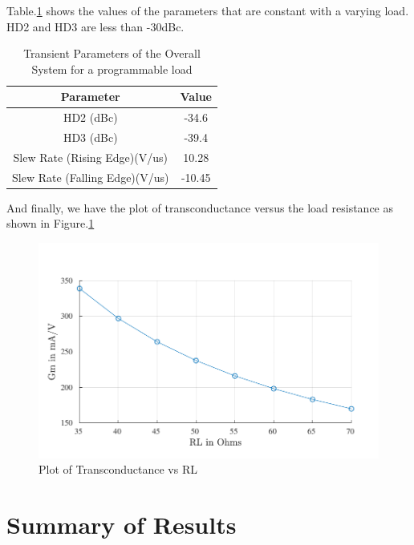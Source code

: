 Table.\ref{tab:RL_trans_2} shows the values of the parameters that are constant with a varying load. HD2 and HD3 are less than -30dBc.
\begin{table} [H]
\centering
\begin{tabular}{@{}cc@{}}
\toprule
Parameter							& Value		\\ \midrule
HD2 (dBc)							& -34.6 			\\
HD3 (dBc)							& -39.4 			\\
Slew Rate (Rising Edge)(V/us)		& 10.28 			\\
Slew Rate (Falling Edge)(V/us)		& -10.45 			\\
\bottomrule
\end{tabular}
\caption{Transient Parameters of the Overall System for a programmable load}
\label{tab:RL_trans_2}
\end{table}
And finally, we have the plot of transconductance versus the load resistance as shown in Figure.\ref{fig:RL_Gm}
\begin{figure} [H]
\centering
\includegraphics[scale=1]{Figures/Plots/Ov_Gm_RL.pdf}
\caption{Plot of Transconductance vs RL}
\label{fig:RL_Gm}
\end{figure}

\section{Summary of Results}

